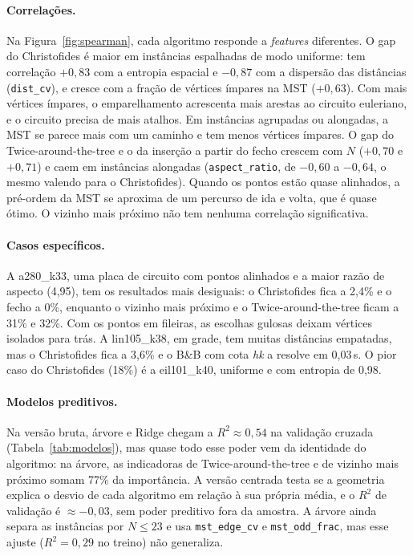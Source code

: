 \documentclass[12pt]{article}
\begin{document}
\paragraph{Correlações.} Na Figura~\ref{fig:spearman}, cada algoritmo responde a
\textit{features} diferentes. O gap do Christofides é maior em instâncias espalhadas de
modo uniforme: tem correlação $+0{,}83$ com a entropia espacial e $-0{,}87$ com a
dispersão das distâncias (\texttt{dist\_cv}), e cresce com a fração de vértices ímpares
na MST ($+0{,}63$). Com mais vértices ímpares, o emparelhamento acrescenta mais arestas
ao circuito euleriano, e o circuito precisa de mais atalhos. Em instâncias agrupadas ou
alongadas, a MST se parece mais com um caminho e tem menos vértices ímpares. O gap do
Twice-around-the-tree e o da inserção a partir do fecho crescem com $N$ ($+0{,}70$ e
$+0{,}71$) e caem em instâncias alongadas (\texttt{aspect\_ratio}, de $-0{,}60$ a
$-0{,}64$, o mesmo valendo para o Christofides). Quando os pontos estão quase
alinhados, a pré-ordem da MST se aproxima de um percurso de ida e volta, que é
quase ótimo. O vizinho mais próximo não tem nenhuma correlação significativa.

\paragraph{Casos específicos.} A a280\_k33, uma placa de circuito com pontos alinhados
e a maior razão de aspecto (4,95), tem os resultados mais desiguais: o Christofides
fica a 2,4\% e o fecho a 0\%, enquanto o vizinho mais próximo e o
Twice-around-the-tree ficam a 31\% e 32\%. Com os pontos em fileiras, as escolhas
gulosas deixam vértices isolados para trás. A lin105\_k38, em grade, tem muitas
distâncias empatadas, mas o Christofides fica a 3,6\% e o B\&B com cota \textit{hk} a
resolve em 0,03\,s. O pior caso do Christofides (18\%) é a eil101\_k40, uniforme e com
entropia de 0,98.

\paragraph{Modelos preditivos.} Na versão bruta, árvore e Ridge chegam a $R^2 \approx
0{,}54$ na validação cruzada (Tabela~\ref{tab:modelos}), mas quase todo esse poder vem
da identidade do algoritmo: na árvore, as indicadoras de Twice-around-the-tree e de
vizinho mais próximo somam 77\% da importância. A versão centrada testa se a geometria
explica o desvio de cada algoritmo em relação à sua própria média, e o $R^2$ de
validação é $\approx -0{,}03$, sem poder preditivo fora da amostra. A árvore ainda
separa as instâncias por $N \le 23$ e usa \texttt{mst\_edge\_cv} e
\texttt{mst\_odd\_frac}, mas esse ajuste ($R^2 = 0{,}29$ no treino) não generaliza.
\end{document}
